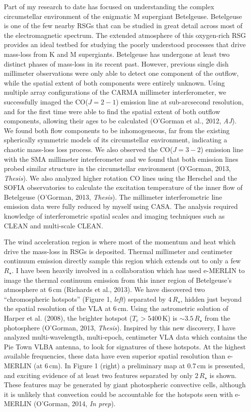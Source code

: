 \documentclass[11pt]{letter} %
\begin{document}
Part of my research to date has focused on understanding the complex circumstellar environment of the enigmatic M supergiant Betelgeuse. Betelgeuse is one of the few nearby RSGs that can be studied in great detail across most of the electromagnetic spectrum. The extended atmosphere of this oxygen-rich RSG provides an ideal testbed for studying the poorly understood processes that drive mass-loss from K and M supergiants. Betelgeuse has undergone at least two distinct phases of mass-loss in its recent past. However, previous single dish millimeter observations were only able to detect one component of the outflow, while the spatial extent of both components were entirely unknown. Using multiple array configurations of the CARMA millimeter interferometer, we successfully imaged the CO($J = 2 - 1$) emission line at sub-arcsecond resolution, and for the first time were able to find the spatial extent of both outflow components, allowing their ages to be calculated (O'Gorman et al., 2012, \textit{AJ}). We found both flow components to be inhomogeneous, far from the existing spherically symmetric models of its circumstellar environment, indicating a chaotic mass-loss loss process. We also observed  the CO($J = 3 - 2$) emission line with the SMA millimeter interferometer and we found that both emission lines probed similar structure in the circumstellar environment (O'Gorman, 2013, \textit{Thesis}). We also analyzed higher rotation CO lines using the Herschel and the SOFIA observatories to calculate the excitation temperature of the inner flow of Betelgeuse (O'Gorman, 2013, \textit{Thesis}). The millimeter interferometric line emission data were fully reduced by myself using CASA. The analysis required knowledge of interferometric spatial scales and imaging techniques such as CLEAN and multi-scale CLEAN. 

The wind acceleration region is where most of the momentum and heat which drive the mass-loss in RSGs is deposited. Thermal millimeter and centimeter continuum emission directly sample this region which extends out to only a few $R_{\star}$. I have been heavily involved in a collaboration which has used e-MERLIN to image the thermal continuum emission from this inner region of Betelgeuse's atmosphere at 6\,cm (Richards et al., 2013). We have discovered two ``chromospheric hotspots'' (Figure 1, \textit{left}) separated by $4\,R_{\star}$, hidden just beyond the spatial resolution of the VLA at 6\,cm. Using the astrometric solution of Harper et al. (2008), the brighter hotspot ($T_{e} > 5400$\,K) is $\sim 3.5\,R_{\star}$ from the photosphere (O'Gorman, 2013, \textit{Thesis}). Inspired by this new discovery, I have analyzed multi-wavelength, multi-epoch, centimeter VLA data which contains the Pie Town VLBA antenna, to look for signatures of these hotspots. At the highest available frequencies, these data have even superior spatial resolution than e-MERLIN (at 6\,cm).  In Figure 1 (right) a preliminary map at 0.7\,cm is presented, and exciting evidence of at least two features separated by only $2\,R_{\star}$ is shown. These features may be generated by  giant photospheric convective cells, although it is unlikely that convection could be accountable for the hotspots seen with e-MERLIN (O'Gorman, 2014, \textit{In prep}).
\end{document}
